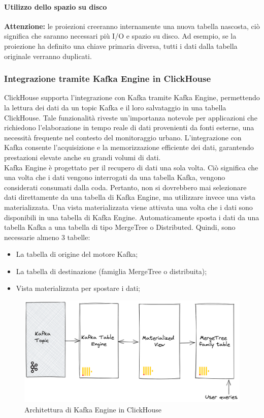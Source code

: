 \paragraph*{Utilizzo dello spazio su disco}
\textbf{Attenzione:} le proiezioni creeranno internamente una nuova tabella nascosta, ciò significa che saranno necessari più I/O e spazio su disco. Ad esempio, se la proiezione ha definito una chiave primaria diversa, tutti i dati dalla tabella originale verranno duplicati.

\subsubsection{Integrazione tramite Kafka Engine in ClickHouse}\label{sec:kafka_engine}
ClickHouse supporta l'integrazione con Kafka tramite Kafka Engine, permettendo la lettura dei dati da un topic Kafka e il loro salvataggio in una tabella ClickHouse. Tale funzionalità riveste un'importanza notevole per applicazioni che richiedono l'elaborazione in tempo reale di dati provenienti da fonti esterne, una necessità frequente nel contesto del monitoraggio urbano. L'integrazione con Kafka consente l'acquisizione e la memorizzazione efficiente dei dati, garantendo prestazioni elevate anche su grandi volumi di dati.\\
Kafka Engine è progettato per il recupero di dati una sola volta. Ciò significa che una volta che i dati vengono interrogati da una tabella Kafka, vengono considerati consumati dalla coda. Pertanto, non si dovrebbero mai selezionare dati direttamente da una tabella di Kafka Engine, ma utilizzare invece una vista materializzata. Una vista materializzata viene attivata una volta che i dati sono disponibili in una tabella di Kafka Engine. Automaticamente sposta i dati da una tabella Kafka a una tabella di tipo MergeTree o Distributed. Quindi, sono necessarie almeno 3 tabelle:
\begin{itemize}
  \item La tabella di origine del motore Kafka;
  \item La tabella di destinazione (famiglia MergeTree o distribuita);
  \item Vista materializzata per spostare i dati;
\end{itemize}
\begin{figure}[H]
  \centering
  \includegraphics[width=.7\textwidth]{../Images/SpecificaTecnica/kafka_engine_architecture.png}
  \caption{Architettura di Kafka Engine in ClickHouse}
  \label{fig:sensorKafka}
\end{figure}

